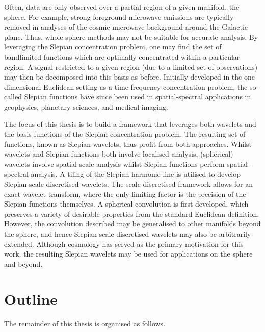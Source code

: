 Often, data are only observed over a partial region of a given manifold, \ie{} the sphere.
For example, strong foreground microwave emissions are typically removed in analyses of the cosmic microwave background around the Galactic plane.
Thus, whole sphere methods may not be suitable for accurate analysis.
By leveraging the Slepian concentration problem, one may find the set of bandlimited functions which are optimally concentrated within a particular region.
A signal restricted to a given region (due to a limited set of observations) may then be decomposed into this basis as before.
Initially developed in the one-dimensional Euclidean setting as a time-frequency concentration problem, the so-called Slepian functions have since been used in spatial-spectral applications in geophysics, planetary sciences, and medical imaging.

The focus of this thesis is to build a framework that leverages both wavelets and the basis functions of the Slepian concentration problem.
The resulting set of functions, known as Slepian wavelets, thus profit from both approaches.
Whilst wavelets and Slepian functions both involve localised analysis, (spherical) wavelets involve spatial-scale analysis whilst Slepian functions perform spatial-spectral analysis.
A tiling of the Slepian harmonic line is utilised to develop Slepian scale-discretised wavelets.
The scale-discretised framework allows for an exact wavelet transform, where the only limiting factor is the precision of the Slepian functions themselves.
A spherical convolution is first developed, which preserves a variety of desirable properties from the standard Euclidean definition.
However, the convolution described may be generalised to other manifolds beyond the sphere, and hence Slepian scale-discretised wavelets may also be arbitrarily extended.
Although cosmology has served as the primary motivation for this work, the resulting Slepian wavelets may be used for applications on the sphere and beyond.

\section{Outline}

The remainder of this thesis is organised as follows.

